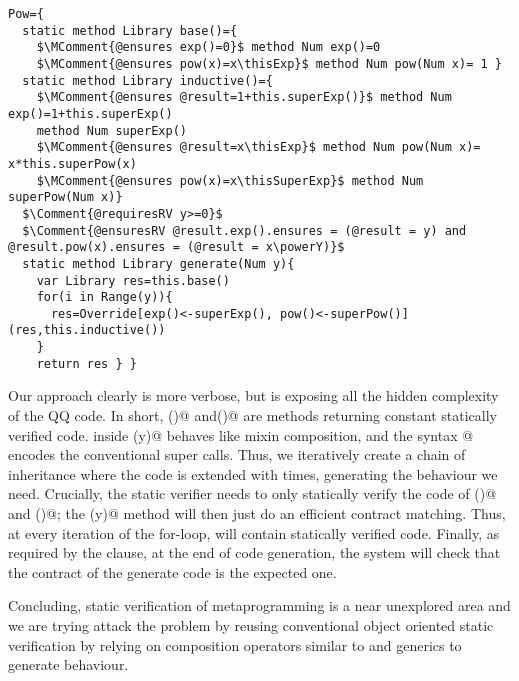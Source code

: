 \documentclass[a4paper,twoside,british,9pt]{extarticle}
\begin{document}
\begin{lstlisting}[language=FortyTwo]
Pow={
  static method Library base()={
    $\MComment{@ensures exp()=0}$ method Num exp()=0 
    $\MComment{@ensures pow(x)=x\thisExp}$ method Num pow(Num x)= 1 }
  static method Library inductive()={
    $\MComment{@ensures @result=1+this.superExp()}$ method Num exp()=1+this.superExp() 
    method Num superExp()
    $\MComment{@ensures @result=x\thisExp}$ method Num pow(Num x)= x*this.superPow(x)
    $\MComment{@ensures pow(x)=x\thisSuperExp}$ method Num superPow(Num x)}
  $\Comment{@requiresRV y>=0}$
  $\Comment{@ensuresRV @result.exp().ensures = (@result = y) and @result.pow(x).ensures = (@result = x\powerY)}$
  static method Library generate(Num y){
    var Library res=this.base()
    for(i in Range(y)){
      res=Override[exp()<-superExp(), pow()<-superPow()](res,this.inductive())
    }
    return res } }
\end{lstlisting}
Our approach clearly is more verbose, but is exposing all the hidden complexity
of the QQ code.
In short, \Q@base()@ and\Q@inductive()@ 
are methods returning constant statically verified code.
\Q@Override@ inside \Q@generate(y)@ behaves like mixin composition,
and the syntax @ encodes the
conventional super calls.
Thus, we iteratively create a chain of inheritance where
the \Q@base@ code is extended with \Q@inductive@ \Q@y@
times, generating the behaviour we need.
Crucially, the static verifier needs to only statically verify the
code of \Q@base()@ and \Q@inductive()@;
the \Q@generate(y)@ method will then just do
an efficient contract matching.
Thus, at every iteration of the for-loop, \Q@res@
will contain statically verified code.
Finally, as required by the \Q@ensuresRV@ clause, at the end of code generation, the system will
check that the contract of the generate code is the expected one.

Concluding, static verification of metaprogramming is a
near unexplored area and we are trying attack the problem by reusing conventional
object oriented static verification by
relying on
composition operators similar to \Q@extends@ and generics to
generate behaviour.
 
\end{document}
